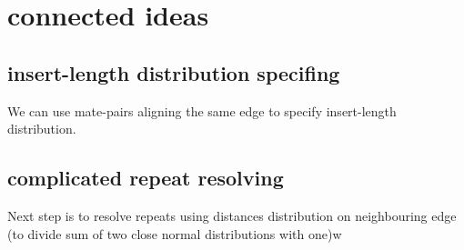 \documentclass[12pt,a4paper,oneside]{article}
\begin{document}
\section{connected ideas}
\subsection{insert-length distribution specifing}
We can use mate-pairs aligning the same edge to specify insert-length distribution.
\subsection{complicated repeat resolving}
Next step is to resolve repeats using distances distribution on neighbouring edge (to divide sum of two close normal distributions with one)w
\end{document}
